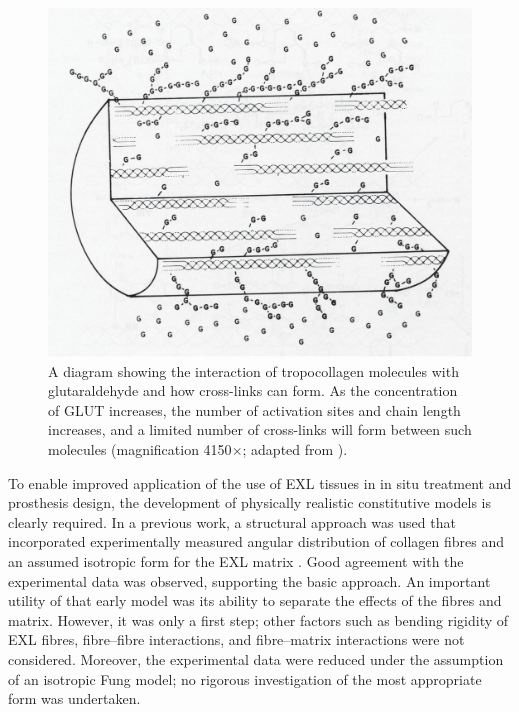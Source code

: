     
\begin{figure}
\centering
\includegraphics[width=\textwidth]{Images/chapter3/F2large.jpg}
\caption{A diagram showing the interaction of tropocollagen molecules with glutaraldehyde and how cross-links can form. As the concentration of GLUT increases, the number of activation sites and chain length increases, and a limited number of cross-links will form between such molecules (magnification 4150$\times$; adapted from \cite{nimni_collagen_2018}).}
\label{c3:fig:2}
\end{figure}

    
    To enable improved application of the use of EXL tissues in in situ treatment and prosthesis design, the development of physically realistic constitutive models is clearly required. In a previous work, a structural approach was used that incorporated experimentally measured angular distribution of collagen fibres and an assumed isotropic form for the EXL matrix \cite{sacks_structural_2000}. Good agreement with the experimental data was observed, supporting the basic approach. An important utility of that early model was its ability to separate the effects of the fibres and matrix. However, it was only a first step; other factors such as bending rigidity of EXL fibres, fibre–fibre interactions, and fibre–matrix interactions were not considered. Moreover, the experimental data were reduced under the assumption of an isotropic Fung model; no rigorous investigation of the most appropriate form was undertaken.
    
